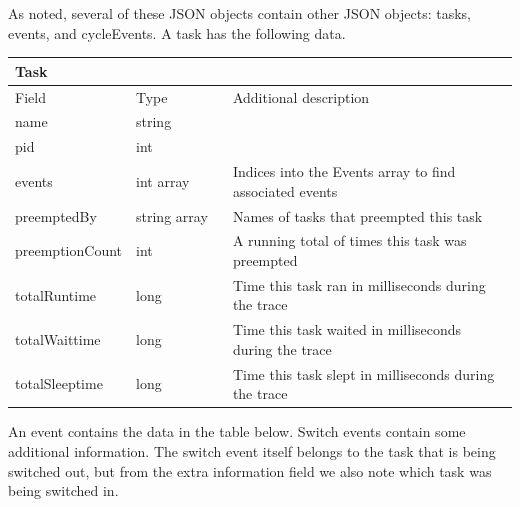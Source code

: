 \documentclass{hmcclinic}
\begin{document}
  As noted, several of these JSON objects contain other JSON objects: tasks,
  events, and cycleEvents. A task has the following data.

  \begin{center}
    \begin{tabular}{p{0.2\linewidth}p{0.2\linewidth}p{0.6\linewidth}}
      \toprule
      Task      &        &                                        \\
      \midrule
      Field           & Type         & Additional description \\
      \midrule
      name            & string       & \\
      pid             & int          & \\
      events          & int array    & Indices into the Events array to find associated events\\
      preemptedBy     & string array & Names of tasks that preempted this task \\
      preemptionCount & int          & A running total of times this task was preempted                    \\
      totalRuntime    & long         & Time this task ran in milliseconds during the trace        \\
      totalWaittime   & long         & Time this task waited in milliseconds during the trace     \\
      totalSleeptime  & long         & Time this task slept in milliseconds during the trace\\
      \bottomrule
    \end{tabular}
  \end{center}

  An event contains the data in the table below. Switch events contain some additional
  information. The switch event itself belongs to the task that is being
  switched out, but from the extra information field we also note which task
  was being switched in.
\end{document}
